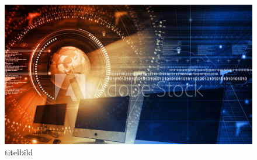%
%
\begin{figure}[!hb]%
    \centering
  \includegraphics[width=.80\textwidth]{Grafiken/titelbild.pdf}%
  \caption{titelbild}%
\end{figure}

